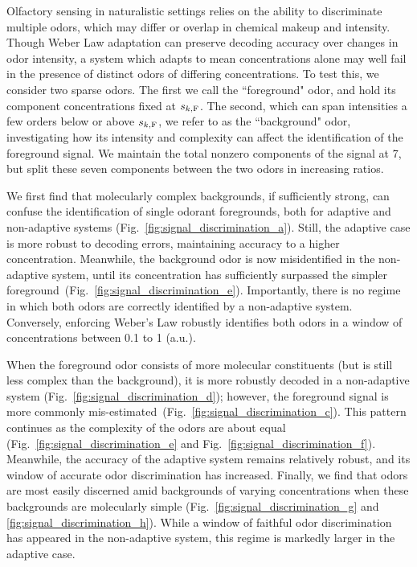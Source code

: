 Olfactory sensing in naturalistic settings relies on the ability to discriminate multiple odors, which may differ or overlap in chemical makeup and intensity. Though Weber Law adaptation can preserve decoding accuracy over changes in odor intensity, a system which adapts to mean concentrations alone may well fail in the presence of distinct odors of differing concentrations. To test this, we consider two sparse odors. The first we call the ``foreground" odor, and hold its component concentrations fixed at $s_{k, \text F}$. The second, which can span intensities a few orders below or above $s_{k, \text F}$, we refer to as the ``background" odor, investigating how its intensity and complexity can affect the identification of the foreground signal. We maintain the total nonzero components of the signal at 7, but split these seven components between the two odors in increasing ratios. 

We first find that molecularly complex backgrounds, if sufficiently strong, can confuse the identification of single odorant foregrounds, both for adaptive and non-adaptive systems (Fig.~\ref{fig:signal_discrimination_a}). Still, the adaptive case is more robust to decoding errors, maintaining accuracy to a higher concentration. Meanwhile, the background odor is now misidentified in the non-adaptive system, until its concentration has sufficiently surpassed the simpler foreground~(Fig.~\ref{fig:signal_discrimination_e}). Importantly, there is no regime in which both odors are correctly identified by a non-adaptive system. Conversely, enforcing Weber's Law robustly identifies both odors in a window of concentrations between 0.1 to 1 (a.u.).

When the foreground odor consists of more molecular constituents (but is still less complex than the background), it is more robustly decoded in a non-adaptive system (Fig.~\ref{fig:signal_discrimination_d}); however, the foreground signal is more commonly mis-estimated~(Fig.~\ref{fig:signal_discrimination_c}). This pattern continues as the complexity of the odors are about equal (Fig.~\ref{fig:signal_discrimination_e} and Fig.~\ref{fig:signal_discrimination_f}). Meanwhile, the accuracy of the adaptive system remains relatively robust, and its window of accurate odor discrimination has increased. Finally, we find that odors are most easily discerned amid backgrounds of varying concentrations when these backgrounds are molecularly simple (Fig.~\ref{fig:signal_discrimination_g} and \ref{fig:signal_discrimination_h}). While a window of faithful odor discrimination has appeared in the non-adaptive system, this regime is markedly larger in the adaptive case.

